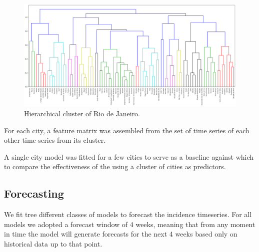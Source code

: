 \documentclass[12pt]{report}
\begin{document}
\begin{figure}
 \centering
 \includegraphics[width=\textwidth]{clusterRJ_06.png}
 \caption{Hierarchical cluster of Rio de Janeiro.}
 \label{fig:cluster_rj}
\end{figure}

For each city, a feature matrix was assembled from the set of time series of 
each other time series from its cluster.

A single city model was fitted  for a few  cities to serve as a 
baseline against which to compare the effectiveness of the using a cluster of  
cities as predictors.

\subsection{Forecasting}

We fit tree different classes of models to forecast the incidence timeseries. For all models we adopted a forecast window of 4 weeks, meaning that from any moment in time the model will generate forecasts for the next 4 weeks based only on historical data up to that point.
\end{document}
